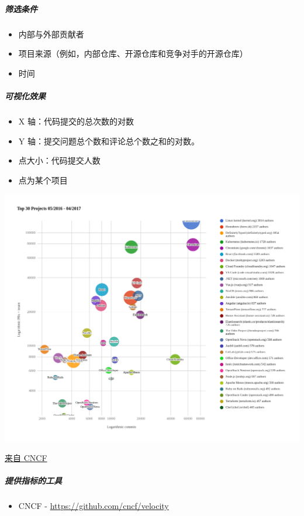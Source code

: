 \hypertarget{ux7b5bux9009ux6761ux4ef6}{%
\subparagraph{筛选条件}\label{ux7b5bux9009ux6761ux4ef6}}

\begin{itemize}
\tightlist
\item
  内部与外部贡献者
\item
  项目来源（例如，内部仓库、开源仓库和竞争对手的开源仓库）
\item
  时间
\end{itemize}

\hypertarget{ux53efux89c6ux5316ux6548ux679c}{%
\subparagraph{可视化效果}\label{ux53efux89c6ux5316ux6548ux679c}}

\begin{itemize}
\tightlist
\item
  X 轴：代码提交的总次数的对数
\item
  Y 轴：提交问题总个数和评论总个数之和的对数。
\item
  点大小：代码提交人数
\item
  点为某个项目
\end{itemize}

\includegraphics{images/project-velocity_visualization.png}

\href{https://www.cncf.io/blog/2017/06/05/30-highest-velocity-open-source-projects/}{来自
CNCF}

\hypertarget{ux63d0ux4f9bux6307ux6807ux7684ux5de5ux5177}{%
\subparagraph{提供指标的工具}\label{ux63d0ux4f9bux6307ux6807ux7684ux5de5ux5177}}

\begin{itemize}
\tightlist
\item
  CNCF -
  \href{https://github.com/cncf/velocity}{https://github.com/cncf/velocity}
\end{itemize}


